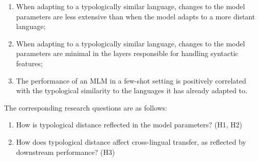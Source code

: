 	\begin{list}{}{\leftmargin=1em \rightmargin=1em}
		\item
		\begin{enumerate}[label=\textbf{H\arabic*:}, leftmargin=*, align=left]
		    \item When adapting to a typologically similar language, changes to the model parameters are less extensive than when the model adapts to a more distant language;
		    \item When adapting to a typologically similar language, changes to the model parameters are minimal in the layers responsible for handling syntactic features;
		    \item The performance of an MLM in a few-shot setting is positively correlated with the typological similarity to the languages it has already adapted to.
		\end{enumerate}
	\end{list}


	\noindent The corresponding research questions are as follows:

	\begin{list}{}{\leftmargin=1em \rightmargin=1em}
		\item
		\begin{enumerate}[label=\textbf{Q\arabic*:}, leftmargin=*, align=left]
			\item How is typological distance reflected in the model parameters? (H1, H2)
			\item How does typological distance affect cross-lingual transfer, as reflected by downstream performance? (H3)
		\end{enumerate}
	\end{list}
